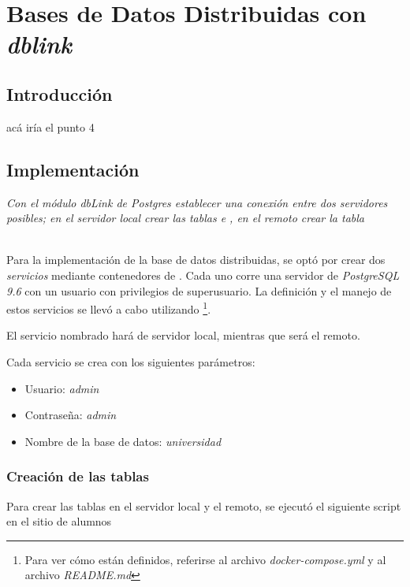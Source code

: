 \section{Bases de Datos Distribuidas con \emph{dblink}}

\subsection{Introducción}
acá iría el punto 4

\subsection{Implementación}
\emph{Con el módulo dbLink de Postgres establecer una conexión entre dos servidores posibles; en el servidor local crear las tablas  e , en el remoto crear la tabla } 

~\\

Para la implementación de la base de datos distribuidas, se optó por crear dos \emph{servicios} mediante contenedores de \docker{}. Cada uno corre una servidor de \emph{PostgreSQL 9.6} con un usuario con privilegios de superusuario. La definición y el manejo de estos servicios se llevó a cabo utilizando \doccom{} \footnote{Para ver cómo están definidos, referirse al archivo \emph{docker-compose.yml} y al archivo \emph{README.md}}.

El servicio nombrado  hará de servidor local, mientras que  será el remoto.

Cada servicio se crea con los siguientes parámetros:
\begin{itemize}
    \item Usuario: \emph{admin} 
    \item Contraseña: \emph{admin} 
    \item Nombre de la base de datos: \emph{universidad} 
\end{itemize}

\subsubsection{Creación de las tablas}

Para crear las tablas en el servidor local y el remoto, se ejecutó el siguiente script en el sitio de alumnos

